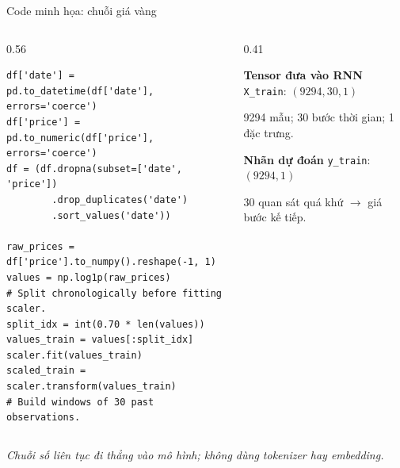 \documentclass[aspectratio=169, 10pt]{beamer}
\begin{document}
\begin{frame}[fragile]{Code minh họa: chuỗi giá vàng}
\small
\begin{columns}[T]
\begin{column}{0.56\textwidth}
\begin{lstlisting}[style=rnnpython]
df['date'] = pd.to_datetime(df['date'], errors='coerce')
df['price'] = pd.to_numeric(df['price'], errors='coerce')
df = (df.dropna(subset=['date', 'price'])
        .drop_duplicates('date')
        .sort_values('date'))

raw_prices = df['price'].to_numpy().reshape(-1, 1)
values = np.log1p(raw_prices)
# Split chronologically before fitting scaler.
split_idx = int(0.70 * len(values))
values_train = values[:split_idx]
scaler.fit(values_train)
scaled_train = scaler.transform(values_train)
# Build windows of 30 past observations.
\end{lstlisting}
\end{column}
\begin{column}{0.41\textwidth}
\begin{block}{\textbf{Tensor đưa vào RNN}}
\texttt{X\_train}: \textbf{$(9294,30,1)$}\par
\vspace{0.15cm}
\footnotesize 9294 mẫu; 30 bước thời gian; 1 đặc trưng.
\end{block}
\vspace{0.15cm}
\begin{exampleblock}{\textbf{Nhãn dự đoán}}
\texttt{y\_train}: \textbf{$(9294,1)$}\par
\vspace{0.15cm}
\footnotesize 30 quan sát quá khứ $\rightarrow$ giá bước kế tiếp.
\end{exampleblock}
\end{column}
\end{columns}
\vspace{0.1cm}
\footnotesize\textit{Chuỗi số liên tục đi thẳng vào mô hình; không dùng tokenizer hay embedding.}
\end{frame}
\end{document}
